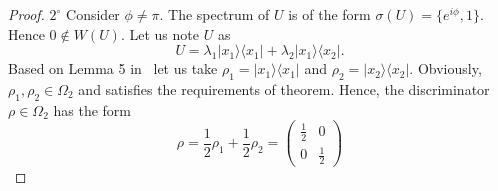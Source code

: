 \documentclass[preprint,12pt, a4paper]{elsarticle}
\newcommand{\ket}[1]{\ensuremath{|#1\rangle}}
\newcommand{\bra}[1]{\ensuremath{\langle#1|}}
\newcommand{\ketbra}[2]{\ensuremath{\ket{#1}\bra{#2}}}
\newcommand{\1}{{\rm 1\hspace{-0.9mm}l}}
\begin{document}
\begin{proof}
	$2^\circ$ Consider  $\phi \not = \pi$. 
The spectrum of $U$ is of the form $\sigma(U) = \{e^{i \phi},1\}$. 
Hence $0 \not\in W\left(U\right)$.  Let us note $U$ as 
	\begin{equation}
	U= \lambda_1 \ketbra{x_1}{x_1} + \lambda_2 \ketbra{x_1}{x_2}.
	\end{equation}
Based on Lemma 5 in~\cite{puchala2018strategies} let us take $\rho_1 = 
\ketbra{x_1}{x_1}$ and $\rho_2 = \ketbra{x_2}{x_2}$. Obviously,  $\rho_1,\rho_2 
\in \Omega_2$ and satisfies the requirements of theorem. Hence, the 
discriminator $\rho \in \Omega_2$ has the form 
	\begin{equation}
	\rho = \frac{1}{2} \rho_1 + \frac{1}{2}\rho_2 = 
	\left(\begin{array}{cc}\frac{1}{2}&0\\0&\frac{1}{2}\end{array}\right)
	\end{equation}


\end{proof}
\end{document}
